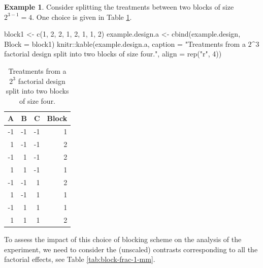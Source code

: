 \documentclass[
]{book}
\newenvironment{Shaded}{\begin{snugshade}}{\end{snugshade}}
\newcommand{\AttributeTok}[1]{\textcolor[rgb]{0.77,0.63,0.00}{#1}}
\newcommand{\DecValTok}[1]{\textcolor[rgb]{0.00,0.00,0.81}{#1}}
\newcommand{\FunctionTok}[1]{\textcolor[rgb]{0.00,0.00,0.00}{#1}}
\newcommand{\NormalTok}[1]{#1}
\newcommand{\OtherTok}[1]{\textcolor[rgb]{0.56,0.35,0.01}{#1}}
\newcommand{\SpecialCharTok}[1]{\textcolor[rgb]{0.00,0.00,0.00}{#1}}
\newcommand{\StringTok}[1]{\textcolor[rgb]{0.31,0.60,0.02}{#1}}
\theoremstyle{definition}
\theoremstyle{definition}
\newtheorem{example}{Example}[chapter]
\theoremstyle{definition}
\theoremstyle{definition}
\theoremstyle{remark}
\begin{document}
\begin{example}
\protect\hypertarget{exm:block-frac-1}{}\label{exm:block-frac-1}Consider splitting the treatments between two blocks of size \(2^{3-1}=4\). One choice is given in Table \ref{tab:block-frac-1}.

\begin{Shaded}
\begin{Highlighting}[]
\NormalTok{block1 }\OtherTok{\textless{}{-}} \FunctionTok{c}\NormalTok{(}\DecValTok{1}\NormalTok{, }\DecValTok{2}\NormalTok{, }\DecValTok{2}\NormalTok{, }\DecValTok{1}\NormalTok{, }\DecValTok{2}\NormalTok{, }\DecValTok{1}\NormalTok{, }\DecValTok{1}\NormalTok{, }\DecValTok{2}\NormalTok{)}
\NormalTok{example.design.a }\OtherTok{\textless{}{-}} \FunctionTok{cbind}\NormalTok{(example.design, }\AttributeTok{Block =}\NormalTok{ block1)}
\NormalTok{knitr}\SpecialCharTok{::}\FunctionTok{kable}\NormalTok{(example.design.a, }\AttributeTok{caption =} \StringTok{"Treatments from a $2\^{}3$ factorial design split into two blocks of size four."}\NormalTok{, }\AttributeTok{align =} \FunctionTok{rep}\NormalTok{(}\StringTok{"r"}\NormalTok{, }\DecValTok{4}\NormalTok{))}
\end{Highlighting}
\end{Shaded}

\begin{table}

\caption{\label{tab:block-frac-1}Treatments from a $2^3$ factorial design split into two blocks of size four.}
\centering
\begin{tabular}[t]{r|r|r|r}
\hline
A & B & C & Block\\
\hline
-1 & -1 & -1 & 1\\
\hline
1 & -1 & -1 & 2\\
\hline
-1 & 1 & -1 & 2\\
\hline
1 & 1 & -1 & 1\\
\hline
-1 & -1 & 1 & 2\\
\hline
1 & -1 & 1 & 1\\
\hline
-1 & 1 & 1 & 1\\
\hline
1 & 1 & 1 & 2\\
\hline
\end{tabular}
\end{table}

To assess the impact of this choice of blocking scheme on the analysis of the experiment, we need to consider the (unscaled) contrasts corresponding to all the factorial effects, see Table \ref{tab:block-frac-1-mm}.


\end{example}
\end{document}
